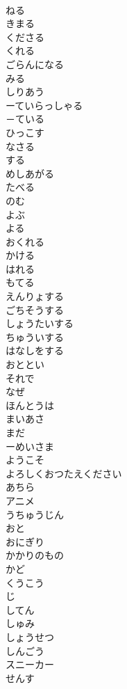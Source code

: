 \documentclass[8pt]{extreport}
\begin{document}
\begin{CJK}{UTF8}{min}
\\	ねる
\\	きまる	
\\	くださる	
\\	くれる
\\	ごらんになる	
\\	みる
\\	しりあう	
\\	ーていらっしゃる	
\\	－ている
\\	ひっこす	
\\	なさる	
\\	する
\\	めしあがる	
\\	たべる 
\\	のむ
\\	よぶ	
\\	よる	
\\	おくれる	
\\	かける	
\\	はれる	
\\	もてる	
\\	えんりょする	
\\	ごちそうする	
\\	しょうたいする	
\\	ちゅういする	
\\	はなしをする	
\\	おととい	
\\	それで	
\\	なぜ	
\\	ほんとうは	
\\	まいあさ	
\\	まだ	
\\	ーめいさま	
\\	ようこそ	
\\	よろしくおつたえください	
\\	あちら	
\\	アニメ	
\\	うちゅうじん	
\\	おと	
\\	おにぎり	
\\	かかりのもの	
\\	かど	
\\	くうこう	
\\	じ	
\\	してん	
\\	しゅみ	
\\	しょうせつ	
\\	しんごう	
\\	スニーカー	
\\	せんす	

\end{CJK}
\end{document}
